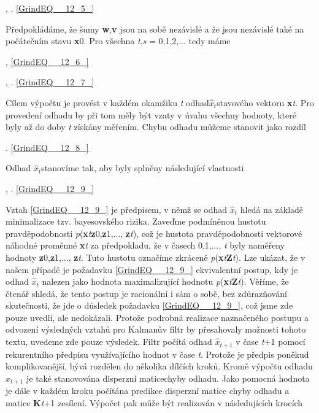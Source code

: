  ,     . \eqref{GrindEQ__12_5_}

\noindent Předpokládáme, že šumy \textbf{w},\textbf{v} jsou na sobě nezávislé a že jsou nezávislé také na počátečním stavu \textbf{x}0. Pro všechna \textit{t},\textit{s} = 0,1,2,...  tedy máme

 , \eqref{GrindEQ__12_6_}

 ,     . \eqref{GrindEQ__12_7_}

\noindent Cílem výpočtu je provést v každém okamžiku \textit{t} odhad$\hat{x}_{t} $stavového vektoru \textbf{x}\textit{t}. Pro provedení odhadu by při tom měly být vzaty v úvahu všechny hodnoty, které byly až do doby \textit{t} získány měřením. Chybu  odhadu můžeme stanovit jako rozdíl 

 . \eqref{GrindEQ__12_8_}

\noindent Odhad $\hat{x}_{t} $stanovíme tak, aby byly splněny následující vlastnosti

 ,     . \eqref{GrindEQ__12_9_}

\noindent Vztah \eqref{GrindEQ__12_9_} je předpisem, v němž se odhad $\hat{x}_{t} $ hledá na základě minimalizace tzv. bayesovského rizika. Zaveďme podmíněnou hustotu pravděpodobnosti \textit{p}(\textbf{x}\textit{t}\textbar \textbf{z}0,\textbf{z}1,..., \textbf{z}\textit{t}), což je hustota pravděpodobnosti vektorové náhodné proměnné \textbf{x}\textit{t} za předpokladu, že v časech 0,1,..., \textit{t} byly naměřeny hodnoty \textbf{z}0,\textbf{z}1,..., \textbf{z}\textit{t}. Tuto hustotu označíme zkráceně \textit{p}(\textbf{x}\textit{t}\textbar \textbf{Z}\textit{t}). Lze ukázat, že v našem případě je požadavku \eqref{GrindEQ__12_9_} ekvivalentní postup, kdy je odhad $\hat{x}_{t} $ nalezen jako hodnota maximalizující hodnotu \textit{p}(\textbf{x}\textit{t}\textbar \textbf{Z}\textit{t}). Věříme, že čtenář shledá, že tento postup je racionální i sám o sobě, bez zdůrazňování skutečnosti, že jde o důsledek požadavku \eqref{GrindEQ__12_9_}, což jsme zde pouze uvedli, ale nedokázali. Protože podrobná realizace naznačeného postupu a odvození výsledných vztahů pro Kalmanův filtr by přesahovaly možnosti tohoto textu, uvedeme zde pouze výsledek. Filtr počítá odhad $\hat{x}_{t+1} $ v čase \textit{t}+1 pomocí rekurentního předpisu využívajícího hodnot v čase \textit{t}. Protože je předpis poněkud komplikovanější, bývá rozdělen do několika dílčích kroků. Kromě výpočtu odhadu $\hat{x}_{t+1} $ je také stanovována disperzní maticechyby odhadu. Jako pomocná hodnota je dále v každém kroku počítána predikce  disperzní matice chyby odhadu a matice \textbf{K}\textit{t}+1 zesílení. Výpočet pak může být realizován v následujících krocích 

